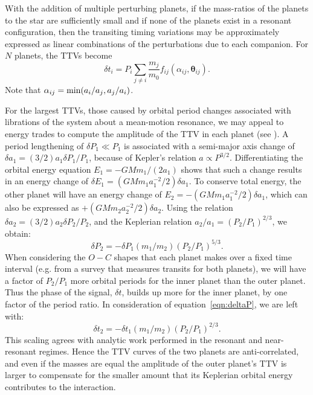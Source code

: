 \documentclass[graybox,natbib,nosecnum]{svmult}
\begin{document}
With the addition of multiple perturbing planets, if the mass-ratios of the planets to the star are
sufficiently small and if none of the planets exist in a resonant configuration, then the transiting timing 
variations may be approximately expressed as linear combinations of the perturbations due to each companion.
For $N$ planets, the TTVs become
\begin{equation}
\delta t_i = P_i \sum_{j \ne i}  \frac{m_j}{m_0} f_{ij}(\alpha_{ij},\mathbf{\theta}_{ij}).
\end{equation}
Note that $\alpha_{ij} = {\rm min}(a_i/a_j,a_j/a_i)$.

For the largest TTVs, those caused by orbital period changes associated with librations of the system about a mean-motion resonance, we may appeal to energy trades to compute the amplitude of the TTV in each planet (see \citealt{2010Sci...330...51H}).  A period lengthening of $\delta P_1 \ll P_1$ is associated with a semi-major axis change of $\delta a_1 = (3/2) a_1 \delta P_1 / P_1$, because of Kepler's relation $a \propto P^{3/2}$.  Differentiating the orbital energy equation $E_1=-G M m_1 /(2a_1)$ shows that such a change results in an energy change of $\delta E_1=(GMm_1 a_1^{-2}/2) \delta a_1$.  To conserve total energy, the other planet will have an energy change of $E_2=-(GMm_1 a_1^{-2}/2) \delta a_1$, which can also be expressed as $+(GMm_2 a_2^{-2}/2)\delta a_2$.  Using the relation $\delta a_2 = (3/2) a_2 \delta P_2 / P_2$, and the Keplerian relation $a_2/a_1=(P_2/P_1)^{2/3}$, we obtain: 
\begin{equation}
\delta P_2 = -\delta P_1 (m_1/m_2) (P_2/P_1)^{5/3}. \label{eqn:deltaP}
\end{equation}
When considering the $O-C$ shapes that each planet makes over a fixed time interval (e.g. from a survey that measures transits for both planets), we will have a factor of $P_2/P_1$ more orbital periods for the inner planet than the outer planet.  Thus the phase of the signal, $\delta t$, builds up more for the inner planet, by one factor of the period ratio. In consideration of equation~\ref{eqn:deltaP}, we are left with: 
\begin{equation}
\delta t_2 = -\delta t_1 (m_1/m_2) (P_2/P_1)^{2/3}. \label{eqn:deltat}
\end{equation}
This scaling agrees with analytic work performed in the resonant \citep{2016ApJ...823...72N} and near-resonant \citep{2012ApJ...761..122L} regimes. Hence the TTV curves of the two planets are anti-correlated, and even if the masses are equal the amplitude of the outer planet's TTV is larger to compensate for the smaller amount that its Keplerian orbital energy contributes to the interaction. 
\end{document}

